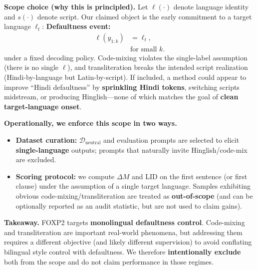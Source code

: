 \begin{itemize}[leftmargin=1.5em]
\begin{description}
\vspace{4pt}
\textbf{Scope choice (why this is principled).}
Let $\ell(\cdot)$ denote language identity and $s(\cdot)$ denote script. Our claimed object is the early commitment to a target language $\ell_t$:
\textbf{Defaultness event:}
\[
\begin{aligned}
\ell(y_{1:k}) &= \ell_t, \\
&\text{for small } k .
\end{aligned}
\]
under a fixed decoding policy. Code-mixing violates the single-label assumption (there is no single $\ell$), and transliteration breaks the intended script realization (Hindi-by-language but Latin-by-script). If included, a method could appear to improve “Hindi defaultness” by \textbf{sprinkling Hindi tokens}, switching scripts midstream, or producing Hinglish—none of which matches the goal of \textbf{clean target-language onset}.

\vspace{4pt}
\textbf{Operationally, we enforce this scope in two ways.}
\begin{itemize}[leftmargin=*,itemsep=2pt]
\item \textbf{Dataset curation:} $\mathcal{D}_{\mathrm{neutral}}$ and evaluation prompts are selected to elicit \textbf{single-language} outputs; prompts that naturally invite Hinglish/code-mix are excluded.
\item \textbf{Scoring protocol:} we compute $\Delta M$ and LID on the first sentence (or first clause) under the assumption of a single target language. Samples exhibiting obvious code-mixing/transliteration are treated as \textbf{out-of-scope} (and can be optionally reported as an audit statistic, but are not used to claim gains).
\end{itemize}

\vspace{4pt}
\textbf{Takeaway.} FOXP2 targets \textbf{monolingual defaultness control}. Code-mixing and transliteration are important real-world phenomena, but addressing them requires a different objective (and likely different supervision) to avoid conflating bilingual style control with defaultness. We therefore \textbf{intentionally exclude} both from the scope and do not claim performance in those regimes.
\end{description}













\end{itemize}
